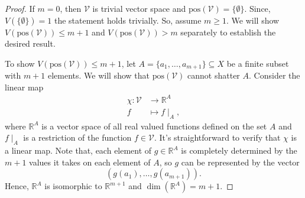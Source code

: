\begin{proof}

    If $m = 0$, then $\mathcal{V}$ is trivial vector space and $\text{pos}(\mathcal{V}) =\{\emptyset\}$. Since, $V(\{\emptyset\}) = 1$ the statement holds trivially. So, assume $m \geq 1$. We will show $V(\text{pos}(\mathcal{V})) \leq m +1$ and $V(\text{pos}(\mathcal{V})) > m $ separately to establish the desired result.

    To show $V(\text{pos}(\mathcal{V})) \leq m +1 $, let $A = \{a_1, \dots, a_{m+1}\} \subseteq X$ be a finite subset with $m+1$ elements. We will show that $\text{pos}(\mathcal{V})$ cannot shatter $A$. Consider the linear map
    \[
        \begin{aligned}
            \chi: \mathcal{V} &\to \mathbb{R}^A \\
            f &\mapsto f \mid_A,
        \end{aligned}
    \]
    where $\mathbb{R}^A$ is a vector space of all real valued functions defined on the set $A$ and $f \mid_A$ is a restriction of the function $f \in \mathcal{V}$. It's straightforward to verify that $\chi$ is a linear map. Note that, each element of $g \in \mathbb{R}^A$ is completely determined by the $m+1$ values it takes on each element of $A$, so $g$ can be represented by the vector
    \[
        (g(a_1), \dots, g(a_{m+1})).
    \]
    Hence, $\mathbb{R}^A$ is isomorphic to $\mathbb{R}^{m+1}$ and $\dim(\mathbb{R}^A) = m+1$.


\end{proof}
